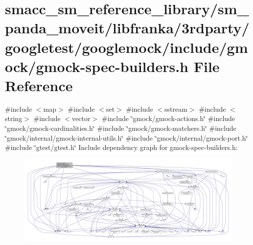 \hypertarget{gmock-spec-builders_8h}{}\section{smacc\+\_\+sm\+\_\+reference\+\_\+library/sm\+\_\+panda\+\_\+moveit/libfranka/3rdparty/googletest/googlemock/include/gmock/gmock-\/spec-\/builders.h File Reference}
\label{gmock-spec-builders_8h}
{\ttfamily \#include $<$map$>$}\newline
{\ttfamily \#include $<$set$>$}\newline
{\ttfamily \#include $<$sstream$>$}\newline
{\ttfamily \#include $<$string$>$}\newline
{\ttfamily \#include $<$vector$>$}\newline
{\ttfamily \#include \char`\"{}gmock/gmock-\/actions.\+h\char`\"{}}\newline
{\ttfamily \#include \char`\"{}gmock/gmock-\/cardinalities.\+h\char`\"{}}\newline
{\ttfamily \#include \char`\"{}gmock/gmock-\/matchers.\+h\char`\"{}}\newline
{\ttfamily \#include \char`\"{}gmock/internal/gmock-\/internal-\/utils.\+h\char`\"{}}\newline
{\ttfamily \#include \char`\"{}gmock/internal/gmock-\/port.\+h\char`\"{}}\newline
{\ttfamily \#include \char`\"{}gtest/gtest.\+h\char`\"{}}\newline
Include dependency graph for gmock-\/spec-\/builders.h\+:
\nopagebreak
\begin{figure}[H]
\begin{center}
\leavevmode
\includegraphics[width=350pt]{gmock-spec-builders_8h__incl}
\end{center}
\end{figure}
